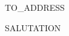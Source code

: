 \documentclass[]{letter}
\begin{document}

\begin{letter}{TO_ADDRESS}
\address{ADDRESS}

\opening{SALUTATION}




\signature{}

\closing{}


\end{letter}
\end{document}
